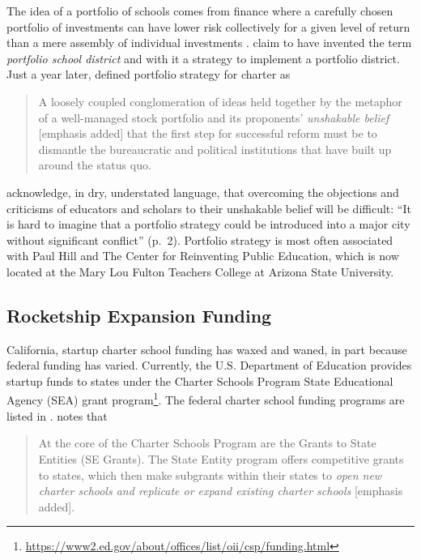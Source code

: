 The idea of a portfolio of schools comes from finance where a carefully chosen portfolio of investments can have lower risk collectively for a given level of return than a mere assembly of individual investments \parencite[See ][for an overview of the mathematics of modern portfolio theory]{Wikipedia2024}. \citeauthor{Hill.etal2009} claim to have invented the term \textit{portfolio school district} \parencite[1]{Hill.etal2009} and with it a strategy to implement a portfolio district. Just a year later, \citeauthor{Henig.etal2010} defined portfolio strategy for charter as
\blockquote[{\parencite{Henig.etal2010}}][]{\SingleSpacing\vspace{-0.5\baselineskip}%
A loosely coupled conglomeration of ideas held together by the metaphor of a well-managed stock portfolio and its proponents’ \textit{unshakable belief} [emphasis added] that the first step for successful reform must be to dismantle the bureaucratic and political institutions that have built up around the status quo.}

\citeauthor{Hill.etal2009} acknowledge, in dry, understated language, that overcoming the objections and criticisms of educators and scholars to their unshakable belief will be difficult: ``It is hard to imagine that a portfolio strategy could be introduced into a major city without significant conflict'' (p.~2). Portfolio strategy is most often associated with Paul Hill and The Center for Reinventing Public Education, which is now located at the Mary Lou Fulton Teachers College at Arizona State University.

\subsection{Rocketship Expansion Funding}\label{sec:rocketship-expansion-funding}\indent

California, startup charter school funding has waxed and waned, in part because federal funding has varied. Currently, the U.S. Department of Education provides startup funds to states under the Charter Schools Program State Educational Agency (SEA) grant program\footnote{\url{https://www2.ed.gov/about/offices/list/oii/csp/funding.html}}. The federal charter school funding programs are listed in \textcite{NCSRC2020}.  notes that 
\blockquote[{\parencite{NAPCS2020}}][]{\SingleSpacing\vspace{-0.5\baselineskip}%
At the core of the Charter Schools Program are the Grants to State Entities (SE Grants). The State Entity program offers competitive grants to states, which then make subgrants within their states to \textit{open new charter schools and replicate or expand existing charter schools} [emphasis added].} 


